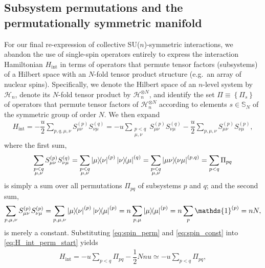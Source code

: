 \documentclass[nofootinbib,notitlepage,11pt]{revtex4-2}
\renewcommand{\t}{\text} %
\newcommand{\f}[2]{\dfrac{#1}{#2}} %
\renewcommand{\set}[1]{\left\{#1\right\}} %
\newcommand{\1}{\mathds{1}}
\renewcommand{\H}{\mathcal{H}}
\renewcommand{\SS}{\mathbb{S}}
\begin{document}
\subsection{Subsystem permutations and the permutationally symmetric
  manifold}
\label{sec:perm_ops}

For our final re-expression of collective SU($n$)-symmetric
interactions, we abandon the use of single-spin operators entirely to
express the interaction Hamiltonian $H_{\t{int}}$ in terms of
operators that permute tensor factors (subsystems) of a Hilbert space
with an $N$-fold tensor product structure (e.g.~an array of nuclear
spins).  Specifically, we denote the Hilbert space of an $n$-level
system by $\H_n$, denote its $N$-fold tensor product by
$\H_n^{\otimes N}$, and identify the set $\Pi\equiv\set{\Pi_s}$ of
operators that permute tensor factors of $\H_n^{\otimes N}$ according
to elements $s\in\SS_N$ of the symmetric group of order $N$.  We then
expand
\begin{align}
  H_{\t{int}}
  = -\f{u}{2} \sum_{p,q,\mu,\nu} S_{\mu\nu}^{(p)} S_{\nu\mu}^{(q)}
  = -u\sum_{\substack{p<q\\\mu,\nu}} S_{\mu\nu}^{(p)} S_{\nu\mu}^{(q)}
  - \f{u}{2} \sum_{p,\mu,\nu} S_{\mu\nu}^{(p)} S_{\nu\mu}^{(p)},
  \label{eq:H_int_perm_start}
\end{align}
where the first sum,
\begin{align}
  \sum_{\substack{p<q\\\mu,\nu}} S_{\mu\nu}^{(p)} S_{\nu\mu}^{(q)}
  = \sum_{\substack{p<q\\\mu,\nu}} \op{\mu}{\nu}^{(p)} \op{\nu}{\mu}^{(q)}
  = \sum_{\substack{p<q\\\mu,\nu}} \op{\mu\nu}{\nu\mu}^{(p,q)}
  = \sum_{p<q} \Pi_{pq}
  \label{eq:spin_perm}
\end{align}
is simply a sum over all permutations $\Pi_{pq}$ of subsystems $p$ and
$q$; and the second sum,
\begin{align}
  \sum_{p,\mu,\nu} S_{\mu\nu}^{(p)} S_{\nu\mu}^{(p)}
  = \sum_{p,\mu,\nu} \op{\mu}{\nu}^{(p)} \op{\nu}{\mu}^{(p)}
  = n \sum_{p,\mu} \op{\mu}{\mu}^{(p)}
  = n \sum_p \1^{(p)}
  = n N,
  \label{eq:spin_const}
\end{align}
is merely a constant.  Substituting \eqref{eq:spin_perm} and
\eqref{eq:spin_const} into \eqref{eq:H_int_perm_start} yields
\begin{align}
  H_{\t{int}} = -u \sum_{p<q} \Pi_{pq} - \f12 N n u
  \simeq -u\sum_{p<q} \Pi_{pq},
  \label{eq:H_int_perm}
\end{align}
\end{document}

